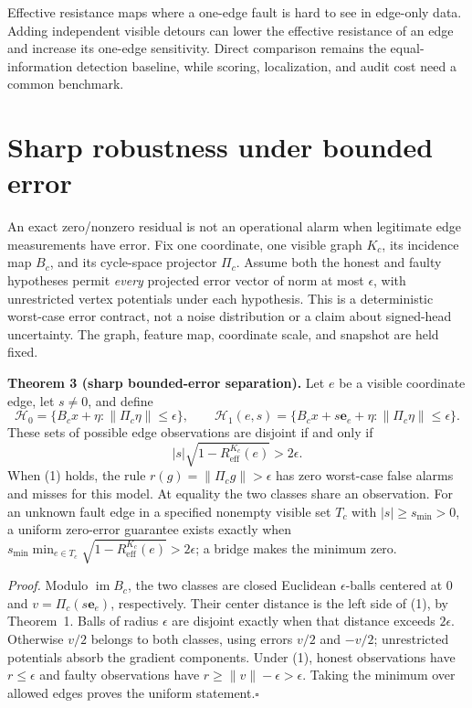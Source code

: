 \documentclass[11pt,a4paper]{article}
\begin{document}


Effective resistance maps where a one-edge fault is hard to see in edge-only data. Adding independent visible
detours can lower the effective resistance of an edge and increase its one-edge sensitivity. Direct comparison remains
the equal-information detection baseline, while scoring, localization, and audit cost need a common benchmark.

\section{Sharp robustness under bounded error}\label{sec:robust}

An exact zero/nonzero residual is not an operational alarm when legitimate edge measurements have error. Fix one
coordinate, one visible graph $K_c$, its incidence map $B_c$, and its cycle-space projector $\Pi_c$. Assume both the
honest and faulty hypotheses permit \emph{every} projected error vector of norm at most $\epsilon$, with unrestricted
vertex potentials under each hypothesis. This is a deterministic worst-case error contract, not a noise distribution or
a claim about signed-head uncertainty. The graph, feature map, coordinate scale, and snapshot are held fixed.

\begin{thebox}
\textbf{Theorem 3 (sharp bounded-error separation).} Let $e$ be a visible coordinate edge, let $s\ne0$, and define
\[
\mathcal H_0=\{B_cx+\eta:\|\Pi_c\eta\|\le\epsilon\},\qquad
\mathcal H_1(e,s)=\{B_cx+s\mathbf e_e+\eta:\|\Pi_c\eta\|\le\epsilon\}.
\]
These sets of possible edge observations are disjoint if and only if
\[
|s|\sqrt{1-R^{K_c}_{\mathrm{eff}}(e)}>2\epsilon.\tag{1}\label{eq:noise-separation}
\]
When (1) holds, the rule $r(g)=\|\Pi_cg\|>\epsilon$ has zero worst-case false alarms and misses for this model. At
equality the two classes share an observation. For an unknown fault edge in a specified nonempty visible set $T_c$ with
$|s|\ge s_{\min}>0$, a uniform zero-error guarantee exists exactly when
$s_{\min}\min_{e\in T_c}\sqrt{1-R^{K_c}_{\mathrm{eff}}(e)}>2\epsilon$; a bridge makes the minimum zero.

\emph{Proof.} Modulo $\operatorname{im}B_c$, the two classes are closed Euclidean $\epsilon$-balls centered at $0$ and
$v=\Pi_c(s\mathbf e_e)$, respectively. Their center distance is the left side of (1), by Theorem~1. Balls of radius
$\epsilon$ are disjoint exactly when that distance exceeds $2\epsilon$. Otherwise $v/2$ belongs to both classes,
using errors $v/2$ and $-v/2$; unrestricted potentials absorb the gradient components. Under (1), honest observations
have $r\le\epsilon$ and faulty observations have $r\ge\|v\|-\epsilon>\epsilon$. Taking the minimum over allowed
edges proves the uniform statement.\hfill$\square$
\end{thebox}
\end{document}
